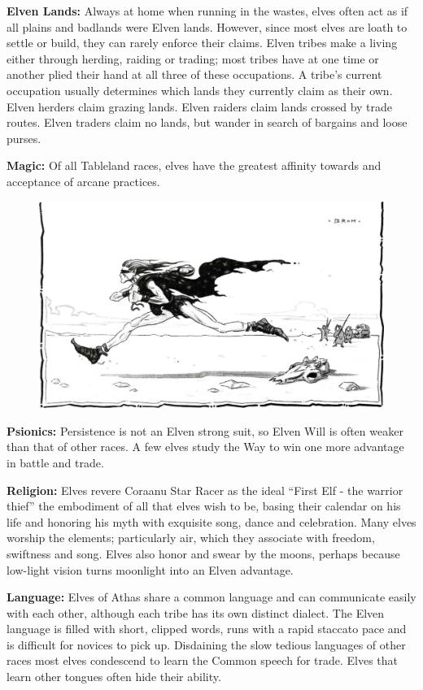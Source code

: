 \textbf{Elven Lands:} Always at home when running in the wastes, elves often act as if all plains and badlands were Elven lands. However, since most elves are loath to settle or build, they can rarely enforce their claims. Elven tribes make a living either through herding, raiding or trading; most tribes have at one time or another plied their hand at all three of these occupations. A tribe's current occupation usually determines which lands they currently claim as their own. Elven herders claim grazing lands. Elven raiders claim lands crossed by trade routes. Elven traders claim no lands, but wander in search of bargains and loose purses.

\textbf{Magic:} Of all Tableland races, elves have the greatest affinity towards and acceptance of arcane practices.

\begin{figure}[t]
\centering
\includegraphics[width=\textwidth]{images/elf-1.png}
\WOTC
\end{figure}

\textbf{Psionics:} Persistence is not an Elven strong suit, so Elven Will is often weaker than that of other races. A few elves study the Way to win one more advantage in battle and trade.

\textbf{Religion:} Elves revere Coraanu Star Racer as the ideal ``First Elf - the warrior thief'' the embodiment of all that elves wish to be, basing their calendar on his life and honoring his myth with exquisite song, dance and celebration. Many elves worship the elements; particularly air, which they associate with freedom, swiftness and song. Elves also honor and swear by the moons, perhaps because low-light vision turns moonlight into an Elven advantage.

\textbf{Language:} Elves of Athas share a common language and can communicate easily with each other, although each tribe has its own distinct dialect. The Elven language is filled with short, clipped words, runs with a rapid staccato pace and is difficult for novices to pick up. Disdaining the slow tedious languages of other races most elves condescend to learn the Common speech for trade. Elves that learn other tongues often hide their ability.

